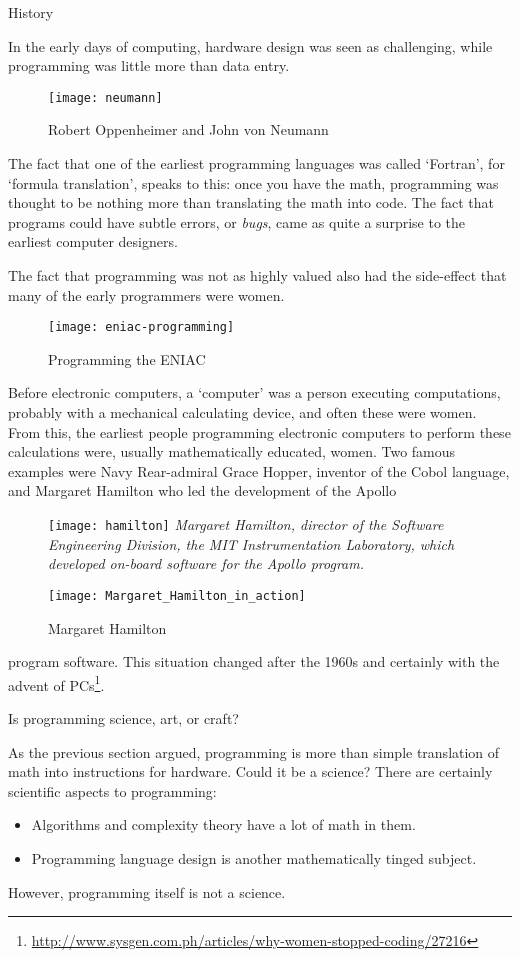  {History}

In the early days of computing, hardware design was seen as
challenging, while programming was little more than data entry.
\begin{figure}[ht]
  \texttt{[image: neumann]}
  \caption{Robert Oppenheimer and John von Neumann}
\end{figure}
The fact that one of the earliest programming languages was called `Fortran',
for  `formula translation', speaks to this:
once you have the math, programming was thought to be nothing more than translating
the math into code. The fact that programs could have subtle errors,
or \emph{bugs}, came as quite a surprise
to the earliest computer designers.

The fact that programming was not as highly valued also had the
side-effect that many of the early programmers were women.
\begin{figure}[ht]
  \texttt{[image: eniac-programming]}\\
  \caption{Programming the ENIAC}
\end{figure}
Before electronic computers, a `computer' was a person executing
computations, probably with a mechanical calculating device,
and often these were women. From this, the earliest people
programming electronic computers to perform these calculations were,
usually mathematically educated, women.
Two famous
examples were Navy Rear-admiral Grace Hopper, inventor of the Cobol
language, and Margaret Hamilton who led the development of the Apollo
\begin{figure}[ht]
  \begin{multicols}{2}
    \texttt{[image: hamilton]}
    \vfill\columnbreak
    \textsl
    {\small Margaret Hamilton, director of the Software Engineering Division,
    the MIT Instrumentation Laboratory, which developed on-board
    software for the Apollo program.}\par
    \texttt{[image: Margaret\_Hamilton\_in\_action]}
    \vfill\hbox{}\columnbreak
    \caption{Margaret Hamilton}
  \end{multicols}
\end{figure}
program software. This situation changed after the 1960s and certainly
with the advent of
PCs\footnote{\url{http://www.sysgen.com.ph/articles/why-women-stopped-coding/27216}}.

 {Is programming science, art, or craft?}

As the previous section argued, programming is more than simple
translation of math into instructions for hardware.
Could it be a science?
There are certainly scientific aspects to programming:
\begin{itemize}
\item Algorithms and complexity theory have a lot of math in them.
\item Programming language design is another mathematically tinged subject.
\end{itemize}
However, programming itself is not a science.

